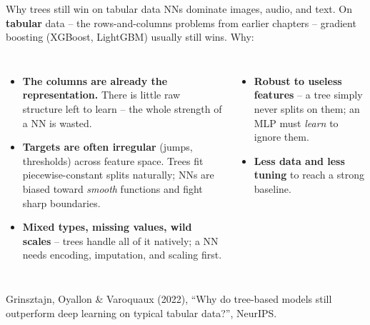 \documentclass[aspectratio=169]{beamer}
\begin{document}
\begin{frame}{Why trees still win on tabular data}
  NNs dominate images, audio, and text. On \textbf{tabular} data -- the rows-and-columns
  problems from earlier chapters -- gradient boosting (XGBoost, LightGBM) usually still wins.
  Why:
  \vfill
  \begin{columns}[T]
    \begin{itemize}\small
      \item \textbf{The columns are already the representation.} There is little raw
        structure left to learn -- the whole strength of a NN is wasted.
      \item \textbf{Targets are often irregular} (jumps, thresholds) across feature space.
        Trees fit piecewise-constant splits naturally; NNs are biased toward \emph{smooth}
        functions and fight sharp boundaries.
      \item \textbf{Mixed types, missing values, wild scales} -- trees handle all of it
        natively; a NN needs encoding, imputation, and scaling first.
    \end{itemize}
    \begin{itemize}\small
      \item \textbf{Robust to useless features} -- a tree simply never splits on them; an MLP
        must \emph{learn} to ignore them.
      \item \textbf{Less data and less tuning} to reach a strong baseline.
    \end{itemize}
    \vskip 4pt
  \end{columns}
  \vfill
  \footnotesize Grinsztajn, Oyallon \& Varoquaux (2022), ``Why do tree-based models still
  outperform deep learning on typical tabular data?'', NeurIPS.
\end{frame}
\end{document}
